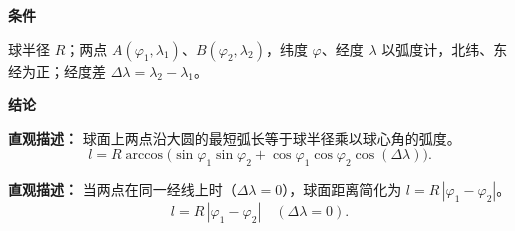 \begin{statementbox}
	\textbf{\textcolor{CStatement}{条件}}
	\begin{description}[style=nextline, leftmargin=2.8em, labelsep=0.5em, itemsep=0.35em]
		\item[\textbf{\textcolor{CStatement}{条件1（经纬度表示）：}}]
			球半径 $R$；两点 $A(\varphi_1,\lambda_1)$、$B(\varphi_2,\lambda_2)$，纬度 $\varphi$、经度 $\lambda$ 以弧度计，北纬、东经为正；经度差 $\Delta\lambda = \lambda_2-\lambda_1$。
	\end{description}

	\medskip
	\textbf{\textcolor{CStatement}{结论}}
	\begin{description}[style=nextline, leftmargin=2.8em, labelsep=0.5em, itemsep=0.45em]
		\item[\textbf{\textcolor{CStatement}{结论一（大圆劣弧长）：}}]
			\textbf{\textcolor{CStatement}{直观描述：}}
			球面上两点沿大圆的最短弧长等于球半径乘以球心角的弧度。
			\[
				l = R\arccos\!\bigl( \sin\varphi_1\sin\varphi_2 + \cos\varphi_1\cos\varphi_2\cos(\Delta\lambda) \bigr).
			\]
		\item[\textbf{\textcolor{CStatement}{推广结论（同经线特例）：}}]
			\textbf{\textcolor{CStatement}{直观描述：}}
			当两点在同一经线上时（$\Delta\lambda=0$），球面距离简化为 $l = R\,|\varphi_1-\varphi_2|$。
			\[
				l = R\,|\varphi_1-\varphi_2| \quad (\Delta\lambda=0).
			\]
	\end{description}

\end{statementbox}

